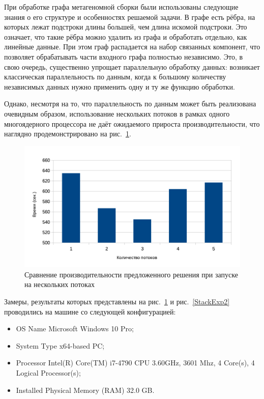 При обработке графа метагеномной сборки были использованы следующие знания о его структуре и особенностях решаемой задачи. В графе есть рёбра, на которых лежат подстроки длины большей, чем длина искомой подстроки. Это означает, что такие рёбра можно удалить из графа и обработать отдельно, как линейные данные. При этом граф распадается на набор связанных компонент, что позволяет обрабатывать части входного графа полностью независимо. Это, в свою очередь, существенно упрощает параллельную обработку данных: возникает классическая параллельность по данным, когда к большому количеству независимых данных нужно применить одну и ту же функцию обработки. 

Однако, несмотря на то, что параллельность по данным может быть реализована очевидным образом, использование нескольких потоков в рамках одного многоядерного процессора не даёт ожидаемого прироста производительности, что наглядно продемонстрировано на рис.~\ref{StackExp}.

\begin{figure}
 \centering
 \includegraphics[width=\textwidth]{Ragozina/pics/Stack.pdf}
 \caption{Сравнение производительности предложенного решения при запуске на нескольких потоках}
 \label{StackExp}
\end{figure} 

Замеры, результаты которых представлены на рис.~\ref{StackExp} и рис.~\ref{StackExp2} проводились на машине со следующей конфигурацией:

\begin{itemize}
\item OS Name Microsoft Windows 10 Pro;
\item System Type x64-based PC;
\item Processor	Intel(R) Core(TM) i7-4790 CPU 3.60GHz, 3601 Mhz, 4 Core(s), 4 Logical Processor(s);
\item Installed Physical Memory (RAM) 32.0 GB.
\end{itemize}

